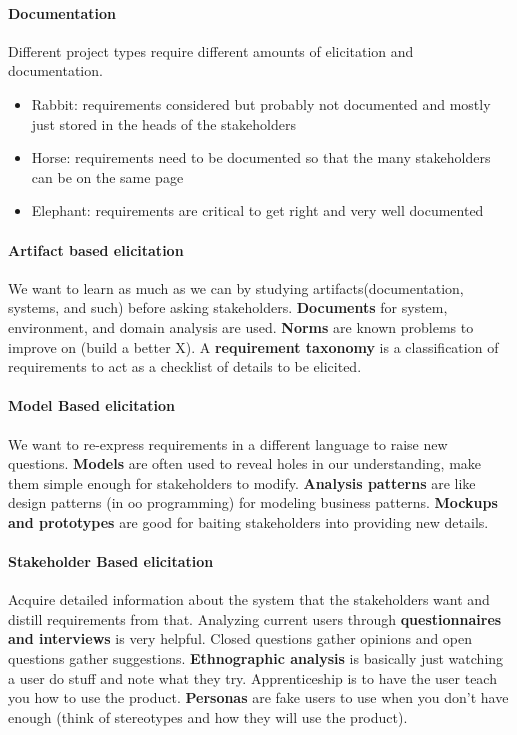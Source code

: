 \documentclass[12pt]{article}
\begin{document}
\paragraph{Documentation} 
\label{par:documentation}
Different project types require different amounts of elicitation and documentation.
\begin{itemize}
	\item Rabbit: requirements considered but probably not documented and mostly just stored in the heads of the stakeholders
	\item Horse: requirements need to be documented so that the many stakeholders can be on the same page
	\item Elephant: requirements are critical to get right and very well documented
\end{itemize}

\paragraph{Artifact based elicitation} 
\label{par:artifact_based_elicitation}
We want to learn as much as we can by studying artifacts(documentation, systems, and such) before asking stakeholders. \textbf{Documents} for system, environment, and domain analysis are used. \textbf{Norms} are known problems to improve on (build a better X). A \textbf{requirement taxonomy} is a classification of requirements to act as a checklist of details to be elicited.

\paragraph{Model Based elicitation} 
\label{par:model_based_elicitation}
We want to re-express requirements in a different language to raise new questions. \textbf{Models} are often used to reveal holes in our understanding, make them simple enough for stakeholders to modify. \textbf{Analysis patterns} are like design patterns (in oo programming) for modeling business patterns. \textbf{Mockups and prototypes} are good for baiting stakeholders into providing new details.

\paragraph{Stakeholder Based elicitation} 
\label{par:stakeholder_based_elicitation}
Acquire detailed information about the system that the stakeholders want and distill requirements from that. Analyzing current users through \textbf{questionnaires and interviews} is very helpful. Closed questions gather opinions and open questions gather suggestions. \textbf{Ethnographic analysis} is basically just watching a user do stuff and note what they try. Apprenticeship is to have the user teach you how to use the product. \textbf{Personas} are fake users to use when you don't have enough (think of stereotypes and how they will use the product). 
\end{document}
